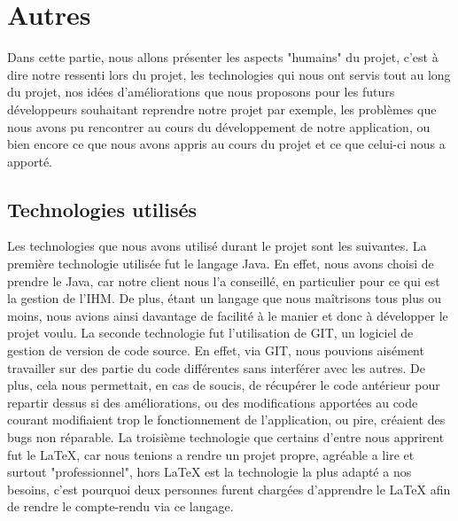 \section{Autres}
	
	Dans cette partie, nous allons présenter les aspects "humains" du projet, c'est à dire notre ressenti lors du projet, les technologies qui nous ont servis tout au long du projet, nos idées d'améliorations que nous proposons pour les futurs développeurs souhaitant reprendre notre projet par exemple, les problèmes que nous avons pu rencontrer au cours du développement de notre application, ou bien encore ce que nous avons appris au cours du projet et ce que celui-ci nous a apporté.

\subsection{Technologies utilisés}
	Les technologies que nous avons utilisé durant le projet sont les suivantes.\newline
	La première technologie utilisée fut le langage Java. En effet, nous avons choisi de prendre le Java, car notre client nous l'a conseillé, en particulier pour ce qui est la gestion de l'IHM. De plus, étant un langage que nous maîtrisons tous plus ou moins, nous avions ainsi davantage de facilité à le manier et donc à développer le projet voulu.\newline
	La seconde technologie fut l'utilisation de GIT, un logiciel de gestion de version de code source. En effet, via GIT, nous pouvions aisément travailler sur des partie du code différentes sans interférer avec les autres. De plus, cela nous permettait, en cas de soucis, de récupérer le code antérieur pour repartir dessus si des améliorations, ou des modifications apportées au code courant modifiaient trop le fonctionnement de l'application, ou pire, créaient des bugs non réparable.\newline
	La troisième technologie que certains d'entre nous apprirent fut le \LaTeX{}, car nous tenions a rendre un projet propre, agréable a lire et surtout "professionnel", hors \LaTeX{} est la technologie la plus adapté a nos besoins, c'est pourquoi deux personnes furent chargées d'apprendre le \LaTeX{} afin de rendre le compte-rendu via ce langage.

